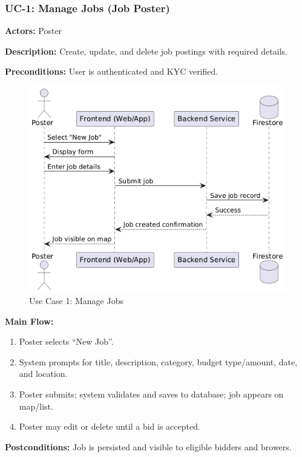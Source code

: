 \documentclass[11pt]{article}
\begin{document}
\subsubsection*{UC-1: Manage Jobs (Job Poster)}
\textbf{Actors:} Poster \par
\textbf{Description:} Create, update, and delete job postings with required details.\par
\textbf{Preconditions:} User is authenticated and KYC verified.\par
\begin{figure}[htbp]
  \centering
\includegraphics[width=0.9\linewidth]{UC-1.png}
  \caption{Use Case 1: Manage Jobs}
  \label{fig:uc1}
\end{figure} \par
\vspace{2em}
\textbf{Main Flow:}
\begin{enumerate}[leftmargin=1.4em]
  \item Poster selects ``New Job''.
  \item System prompts for title, description, category, budget type/amount, date, and location.
  \item Poster submits; system validates and saves to database; job appears on map/list.
  \item Poster may edit or delete until a bid is accepted.
\end{enumerate}
\textbf{Postconditions:} Job is persisted and visible to eligible bidders and browers.
\end{document}
